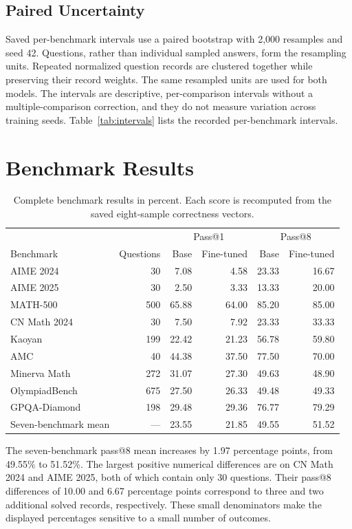 \documentclass[11pt,letterpaper]{article}
\begin{document}
\subsection{Paired Uncertainty}
Saved per-benchmark intervals use a paired bootstrap with 2,000 resamples and seed 42. Questions, rather than individual sampled answers, form the resampling units. Repeated normalized question records are clustered together while preserving their record weights. The same resampled units are used for both models. The intervals are descriptive, per-comparison intervals without a multiple-comparison correction, and they do not measure variation across training seeds. Table~\ref{tab:intervals} lists the recorded per-benchmark intervals.

\section{Benchmark Results}
\begin{table}[htbp]\centering\small
\caption{Complete benchmark results in percent. Each score is recomputed from the saved eight-sample correctness vectors.}\label{tab:results}
\begin{tabular}{lrrrrr}\toprule
 & & \multicolumn{2}{c}{Pass@1} & \multicolumn{2}{c}{Pass@8}\\
Benchmark & Questions & Base & Fine-tuned & Base & Fine-tuned\\\midrule
AIME 2024 & 30 & 7.08 & 4.58 & 23.33 & 16.67 \\
AIME 2025 & 30 & 2.50 & 3.33 & 13.33 & 20.00 \\
MATH-500 & 500 & 65.88 & 64.00 & 85.20 & 85.00 \\
CN Math 2024 & 30 & 7.50 & 7.92 & 23.33 & 33.33 \\
Kaoyan & 199 & 22.42 & 21.23 & 56.78 & 59.80 \\
AMC & 40 & 44.38 & 37.50 & 77.50 & 70.00 \\
Minerva Math & 272 & 31.07 & 27.30 & 49.63 & 48.90 \\
OlympiadBench & 675 & 27.50 & 26.33 & 49.48 & 49.33 \\
GPQA-Diamond & 198 & 29.48 & 29.36 & 76.77 & 79.29 \\
\midrule
Seven-benchmark mean & --- & 23.55 & 21.85 & 49.55 & 51.52\\\bottomrule
\end{tabular}
\end{table}

The seven-benchmark pass@8 mean increases by 1.97 percentage points, from 49.55\% to 51.52\%. The largest positive numerical differences are on CN Math 2024 and AIME 2025, both of which contain only 30 questions. Their pass@8 differences of 10.00 and 6.67 percentage points correspond to three and two additional solved records, respectively. These small denominators make the displayed percentages sensitive to a small number of outcomes.
\end{document}
